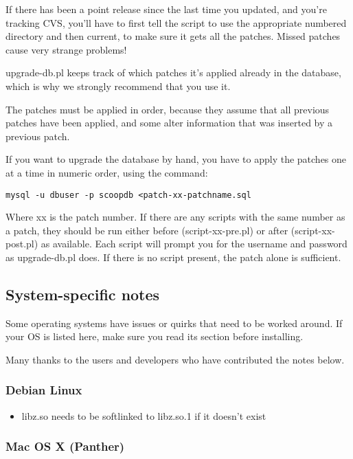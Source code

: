 If there has been a point release since the last time you updated, and you're tracking CVS, you'll have to first tell the script to use the appropriate numbered directory and then current, to make sure it gets all the patches. Missed patches cause very strange problems!

upgrade-db.pl keeps track of which patches it's applied already in the database, which is why we strongly recommend that you use it.

The patches must be applied in order, because they assume that all previous patches have been applied, and some alter information that was inserted by a previous patch.

If you want to upgrade the database by hand, you have to apply the patches one at a time in numeric order, using the command:

\begin{verbatim}
mysql -u dbuser -p scoopdb <patch-xx-patchname.sql
\end{verbatim}

Where xx is the patch number.  If there are any scripts with the same number as a patch, they should be run either before (script-xx-pre.pl) or after (script-xx-post.pl) as available.  Each script will prompt you for the username and password as upgrade-db.pl does.  If there is no script present, the patch alone is sufficient.

\subsection{System-specific notes}
\label{install-system-notes}

Some operating systems have issues or quirks that need to be worked around.  If your OS is listed here, make sure you read its section before installing.

Many thanks to the users and developers who have contributed the notes below.

\subsubsection{Debian Linux}

\begin{itemize}
\item libz.so needs to be softlinked to libz.so.1 if it doesn't exist
\end{itemize}

\subsubsection{Mac OS X (Panther)}


